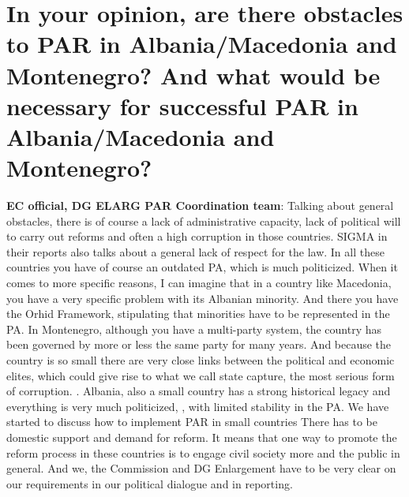 \section{ In your opinion, are there obstacles to PAR in Albania/Macedonia and Montenegro? And what would be necessary for successful PAR in Albania/Macedonia and Montenegro? }
\label{sec:montenegro2}
\textbf{EC official, DG ELARG PAR Coordination team}: Talking about general obstacles, there is of course a lack of administrative capacity, lack of political will to carry out reforms and often a high corruption in those countries. SIGMA in their reports also talks about a general lack of respect for the law. In all these countries you have of course an outdated PA, which is much politicized. When it comes to more specific reasons, I can imagine that in a country like Macedonia, you have a very specific problem with its Albanian minority. And there you have the Orhid Framework, stipulating that minorities have to be represented in the PA. In Montenegro, although you have a multi-party system, the country has been governed by more or less the same party for many years. And because the country is so small there are very close links between the political and economic elites, which could give rise to what we call state capture, the most serious form of corruption. . Albania, also a small country has a strong historical legacy and everything is very much politicized, , with limited stability in the PA. We have started to discuss how to implement PAR in small countries There has to be domestic support and demand for reform. It means that one way to promote the reform process in these countries is to engage civil society more and the public in general. And we, the Commission and DG Enlargement have to be very clear on our requirements in our political dialogue and in reporting. \\
